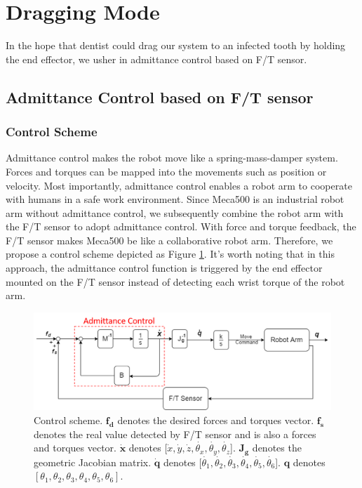 \section{Dragging Mode}
\hspace*{6mm}In the hope that dentist could drag our system to an infected tooth by holding the end effector, we usher in admittance control based on F/T sensor.
\subsection{Admittance Control based on F/T sensor}
\label{sec:adm ctrl}
\subsubsection{Control Scheme}
\hspace*{6mm}Admittance control makes the robot move like a spring-mass-damper system. Forces and torques can be mapped into the movements such as position or velocity. Most importantly, admittance control enables a robot arm to cooperate with humans in a safe work environment. Since Meca500 is an industrial robot arm without admittance control, we subsequently combine the robot arm with the F/T sensor to adopt admittance control. With force and torque feedback, the F/T sensor makes Meca500 be like a collaborative robot arm. Therefore, we propose a control scheme depicted as Figure \ref{fig:adm ctrl}. It's worth noting that in this approach, the admittance control function is triggered by the end effector mounted on the F/T sensor instead of detecting each wrist torque of the robot arm.
\par
\begin{figure}[htbp]
\begin{center}
\includegraphics[width=1\linewidth]{Images/adm ctrl.png}
\caption{
Control scheme. $\boldsymbol{f_d}$ denotes the desired forces and torques vector. $\boldsymbol{f_s}$ denotes the real value detected by F/T sensor and is also a forces and torques vector. $\boldsymbol{\dot{x}}$ denotes [$\dot{x}, \dot{y}, \dot{z}, \dot{\theta _x}, \dot{\theta _y}, \dot{\theta _z}$]. $\mathbf{J_g}$ denotes the geometric Jacobian matrix. $\boldsymbol{\dot{q}}$ denotes [$\dot{\theta _1}, \dot{\theta _2}, \dot{\theta _3}, \dot{\theta _4}, \dot{\theta _5}, \dot{\theta _6}$]. $\boldsymbol{q}$ denotes $\left[\theta _1, \theta _2, \theta _3, \theta _4, \theta _5, \theta _6 \right] $.
}\label{fig:adm ctrl}
\end{center}
\end{figure}
